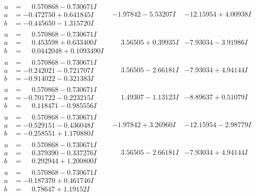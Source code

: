 \documentclass[1p]{elsarticle_modified}
\theoremstyle{definition}
\begin{document}
$$\begin{array}{c|c|c}
\begin{aligned}
u &= \phantom{-}0.570868 - 0.730671 I \\
a &= -0.472750 + 0.641845 I \\
b &= -0.445650 - 1.315720 I\end{aligned}
 & -1.97842 - 5.53207 I & -12.15954 + 4.00938 I \\ \hline\begin{aligned}
u &= \phantom{-}0.570868 - 0.730671 I \\
a &= \phantom{-}0.453598 + 0.633400 I \\
b &= \phantom{-}0.0442048 + 0.1093490 I\end{aligned}
 & \phantom{-}3.56505 + 0.39935 I & -7.93034 - 3.91986 I \\ \hline\begin{aligned}
u &= \phantom{-}0.570868 - 0.730671 I \\
a &= -0.242021 - 0.721707 I \\
b &= -0.914022 - 0.321383 I\end{aligned}
 & \phantom{-}3.56505 - 2.66181 I & -7.93034 + 4.94144 I \\ \hline\begin{aligned}
u &= \phantom{-}0.570868 - 0.730671 I \\
a &= -0.701722 - 0.223215 I \\
b &= \phantom{-}0.118471 - 0.985556 I\end{aligned}
 & \phantom{-}1.49307 - 1.13123 I & -8.89637 + 0.51079 I \\ \hline\begin{aligned}
u &= \phantom{-}0.570868 - 0.730671 I \\
a &= -0.529151 - 0.436048 I \\
b &= -0.258551 + 1.170880 I\end{aligned}
 & -1.97842 + 3.26960 I & -12.15954 - 2.98779 I \\ \hline\begin{aligned}
u &= \phantom{-}0.570868 - 0.730671 I \\
a &= \phantom{-}0.379390 - 0.337276 I \\
b &= \phantom{-}0.292944 + 1.200800 I\end{aligned}
 & \phantom{-}3.56505 - 2.66181 I & -7.93034 + 4.94144 I \\ \hline\begin{aligned}
u &= \phantom{-}0.570868 - 0.730671 I \\
a &= -0.187370 + 0.461746 I \\
b &= \phantom{-}0.78647 + 1.19152 I\end{aligned}

\end{array}$$
\end{document}
